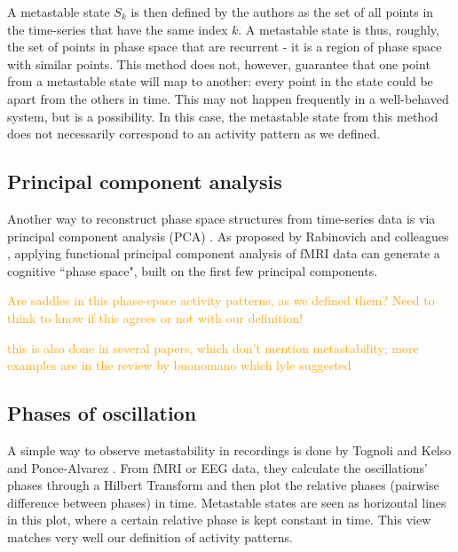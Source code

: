 \documentclass[preprint,superscriptaddress,showpacs,amsmath,amssymb,aps,pre,floatfix]{revtex4-1}
\theoremstyle{definition}
\begin{document}
A metastable state $S_k$ is then defined by the authors as the set of all points in the time-series that have the same index $k$. A metastable state is thus, roughly, the set of points in phase space that are recurrent - it is a region of phase space with similar points. 
This method does not, however, guarantee that one point from a metastable state will map to another: every point in the state could be apart from the others in time. This may not happen frequently in a well-behaved system, but is a possibility. In this case, the metastable state from this method does not necessarily correspond to an activity pattern as we defined.

\subsection{Principal component analysis}
Another way to reconstruct phase space structures from time-series data is via principal component analysis (PCA) \cite{viviani_2005, rabinovich_2008}. As proposed by Rabinovich and colleagues \cite{rabinovich_2008}, applying functional principal component analysis of fMRI data can generate a cognitive ``phase space", built on the first few principal components. 

\textcolor{orange}{Are saddles in this phase-space activity patterns, as we defined them? Need to think to know if this agrees or not with our definition!}

\textcolor{orange}{this is also done in several papers, which don't mention metastability; more examples are in the review by buonomano which lyle suggested}


\subsection{Phases of oscillation}
A simple way to observe metastability in recordings is done by Tognoli and Kelso \cite{tognoli_2014} and Ponce-Alvarez \cite{ponce-alvarez_2015}. From fMRI or EEG data, they calculate the oscillations' phases through a Hilbert Transform and then plot the relative phases (pairwise difference between phases) in time. Metastable states are seen as horizontal lines in this plot, where a certain relative phase is kept constant in time. This view matches very well our definition of activity patterns.
\end{document}
